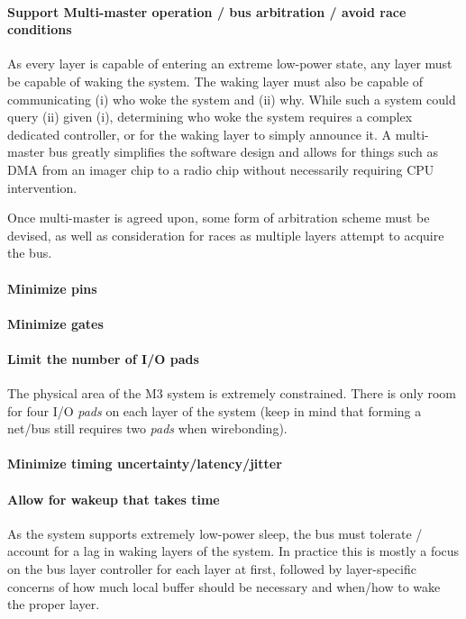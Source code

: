 \paragraph{Support Multi-master operation / bus arbitration / avoid race
conditions}
As every layer is capable of entering an extreme low-power state, any layer
must be capable of waking the system. The waking layer must also be capable of
communicating (i) who woke the system and (ii) why. While such a system could
query (ii) given (i), determining who woke the system requires a complex
dedicated controller, or for the waking layer to simply announce it. A
multi-master bus greatly simplifies the software design and allows for things
such as DMA from an imager chip to a radio chip without necessarily requiring
CPU intervention.

Once multi-master is agreed upon, some form of arbitration scheme must be
devised, as well as consideration for races as multiple layers attempt to
acquire the bus.

\paragraph{Minimize pins}
\paragraph{Minimize gates}
\paragraph{Limit the number of I/O pads}
The physical area of the M3 system is extremely constrained. There is only
room for four I/O {\em pads} on each layer of the system (keep in mind that
forming a net/bus still requires two {\em pads} when wirebonding).

\paragraph{Minimize timing uncertainty/latency/jitter}

\paragraph{Allow for wakeup that takes time}
As the system supports extremely low-power sleep, the bus must tolerate /
account for a lag in waking layers of the system. In practice this is
mostly a focus on the bus layer controller for each layer at first, followed
by layer-specific concerns of how much local buffer should be necessary and
when/how to wake the proper layer.

